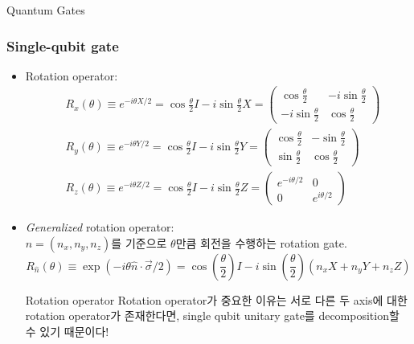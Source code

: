 \documentclass[9pt]{beamer}
\begin{document}
\begin{section}{Quantum Gates}
        \begin{frame}
            \frametitle{Single-qubit gate}
                \begin{itemize}
                    \item Rotation operator:
                    $$
                    \begin{aligned}
                    & R_x(\theta) \equiv e^{-i \theta X / 2}=\cos \frac{\theta}{2} I-i \sin \frac{\theta}{2} X=\left(\begin{array}{cc}
                    \cos \frac{\theta}{2} & -i \sin \frac{\theta}{2} \\
                    -i \sin \frac{\theta}{2} & \cos \frac{\theta}{2}
                    \end{array}\right) \\
                    & R_y(\theta) \equiv e^{-i \theta Y / 2}=\cos \frac{\theta}{2} I-i \sin \frac{\theta}{2} Y=\left(\begin{array}{cc}
                    \cos \frac{\theta}{2} & -\sin \frac{\theta}{2} \\
                    \sin \frac{\theta}{2} & \cos \frac{\theta}{2}
                    \end{array}\right) \\
                    & R_z(\theta) \equiv e^{-i \theta Z / 2}=\cos \frac{\theta}{2} I-i \sin \frac{\theta}{2} Z=\left(\begin{array}{cc}
                    e^{-i \theta / 2} & 0 \\
                    0 & e^{i \theta / 2}
                    \end{array}\right )
                    \end{aligned}
                    $$
                    \item \textit{Generalized} rotation operator:
                    \\$\hat n = (n_x, n_y, n_z)$를 기준으로 $\theta$만큼 회전을 수행하는 rotation gate.
                    $$
                    R_{\hat{n}}(\theta) \equiv \exp (-i \theta \hat{n} \cdot \vec{\sigma} / 2)=\cos \left(\frac{\theta}{2}\right) I-i \sin \left(\frac{\theta}{2}\right)\left(n_x X+n_y Y+n_z Z\right)
                    $$
                    \begin{alertblock}{Rotation operator}
                        Rotation operator가 중요한 이유는 서로 다른 두 axis에 대한 rotation operator가 존재한다면, single qubit unitary gate를 decomposition할 수 있기 때문이다!
                    \end{alertblock}
                \end{itemize}
        \end{frame}



\end{section}
\end{document}

